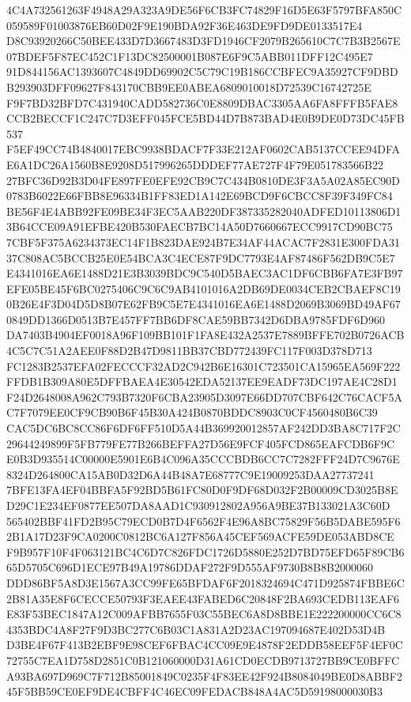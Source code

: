 \documentclass[UTF8,fontset=fandol,zihao=-4,a4paper]{ctexart}
\begin{document}
{{4C4A732561263F4948A29A323A9DE56F6CB3FC74829F16D5E63F5797BFA850C059589F01003876EB60D02F9E190BDA92F36E463DE9FD9DE0133517E4
D8C93920266C50BEE433D7D3667483D3FD1946CF2079B265610C7C7B3B2567E07BDEF5F87EC452C1F13DC82500001B087E6F9C5ABB011DFF12C495E7
91D844156AC1393607C4849DD69902C5C79C19B186CCBFEC9A35927CF9DBDB293903DFF09627F843170CBB9EE0ABEA6809010018D72539C16742725E
F9F7BD32BFD7C431940CADD582736C0E8809DBAC3305AA6FA8FFFB5FAE8CCB2BECCF1C247C7D3EFF045FCE5BD44D7B873BAD4E0B9DE0D73DC45FB537
F5EF49CC74B4840017EBC9938BDACF7F33E212AF0602CAB5137CCEE94DFAE6A1DC26A1560B8E9208D517996265DDDEF77AE727F4F79E051783566B22
27BFC36D92B3D04FE897FE0EFE92CB9C7C434B0810DE3F3A5A02A85EC90D0783B6022E66FBB8E96334B1FF83ED1A142E69BCD9F6CBCC8F39F349FC84
BE56F4E4ABB92FE09BE34F3EC5AAB220DF387335282040ADFED10113806D13B64CCE09A91EFBE420B530FAECB7BC14A50D7660667ECC9917CD90BC75
7CBF5F375A6234373EC14F1B823DAE924B7E34AF44ACAC7F2831E300FDA3137C808AC5BCCB25E0E54BCA3C4ECE87F9DC7793E4AF87486F562DB9C5E7
E4341016EA6E1488D21E3B3039BDC9C540D5BAEC3AC1DF6CBB6FA7E3FB97EFE05BE45F6BC0275406C9C6C9AB4101016A2DB69DE0034CEB2CBAEF8C19
0B26E4F3D04D5D8B07E62FB9C5E7E4341016EA6E1488D2069B3069BD49AF670849DD1366D0513B7E457FF7BB6DF8CAE59BB7342D6DBA9785FDF6D960
DA7403B4904EF0018A96F109BB101F1FA8E432A2537E7889BFFE702B0726ACB4C5C7C51A2AEE0F88D2B47D9811BB37CBD772439FC117F003D378D713
FC1283B2537EFA02FECCCF32AD2C942B6E16301C723501CA15965EA569F222FFDB1B309A80E5DFFBAEA4E30542EDA52137EE9EADF73DC197AE4C28D1
F24D2648008A962C793B7320F6CBA23905D3097E66DD707CBF642C76CACF5AC7F7079EE0CF9CB90B6F45B30A424B0870BDDC8903C0CF4560480B6C39
CAC5DC6BC8CC86F6DF6FF510D5A44B369920012857AF242DD3BA8C717F2C29644249899F5FB779FE77B266BEFFA27D56E9FCF405FCD865EAFCDB6F9C
E0B3D935514C00000E5901E6B4C096A35CCCBDB6CC7C7282FFF24D7C9676E8324D264800CA15AB0D32D6A44B48A7E68777C9E19009253DAA27737241
7BFE13FA4EF04BBFA5F92BD5B61FC80D0F9DF68D032F2B00009CD3025B8ED29C1E234EF0877EE507DA8AAD1C930912802A956A9BE37B133021A3C60D
565402BBF41FD2B95C79ECD0B7D4F6562F4E96A8BC75829F56B5DABE595F62B1A17D23F9CA0200C0812BC6A127F856A45CEF569ACFE59DE053ABD8CE
F9B957F10F4F063121BC4C6D7C826FDC1726D5880E252D7BD75EFD65F89CB665D5705C696D1ECE97B49A19786DDAF272F9D555AF9730B8B8B2000060
DDD86BF5A8D3E1567A3CC99FE65BFDAF6F2018324694C471D925874FBBE6C2B81A35E8F6CECCE50793F3EAEE43FABED6C20848F2BA693CEDB113EAF6
E83F53BEC1847A12C009AFBB7655F03C55BEC6A8D8BBE1E222200000CC6C84353BDC4A8F27F9D3BC277C6B03C1A831A2D23AC197094687E402D53D4B
D3BE4F67F413B2EBF9E98CEF6FBAC4CC09E9E4878F2EDDB58EEF5F4EF0C72755C7EA1D758D2851C0B121060000D31A61CD0ECDB9713727BB9CE0BFFC
A93BA697D969C7F712B85001849C0235F4F83EE42F924B8084049BE0D8ABBF245F5BB59CE0EF9DE4CBFF4C46EC09FEDACB848A4AC5D59198000030B3
}}
\end{document}
